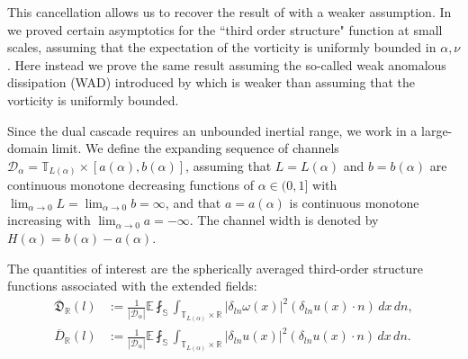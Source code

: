 \documentclass[11pt,a4paper]{article}
\numberwithin{equation}{section}
\numberwithin{theorem}{section}
\numberwithin{remark}{section}
\numberwithin{definition}{section}
\begin{document}
This cancellation allows us to recover the result of \cite{YuriAmiraliGigliola} with a weaker assumption. In \cite{YuriAmiraliGigliola} we proved certain asymptotics for the ``third order structure" function at small scales, assuming that the expectation of the vorticity is uniformly bounded in $\alpha,\nu$. Here instead we prove the same result assuming the so-called weak anomalous dissipation (WAD) introduced by \cite{bed2D} which is weaker than assuming that the vorticity is uniformly bounded. 




Since the dual cascade requires an unbounded inertial range, we work in a large-domain limit. We define the expanding sequence of channels
$\mathcal{D}_\alpha = \mathbb{T}_{L(\alpha)} \times [a(\alpha), b(\alpha)]$,
assuming that $L=L(\alpha)$ and $b=b(\alpha)$ are continuous monotone
decreasing functions of $\alpha \in (0,1]$ with $\lim_{\alpha \to 0}L =
\lim_{\alpha \to 0}b = \infty$, and that $a=a(\alpha)$ is continuous monotone
increasing with $\lim_{\alpha \to 0}a = -\infty$. The channel width is denoted
by $H(\alpha) = b(\alpha) - a(\alpha)$.

The quantities of interest are the spherically averaged third-order structure
functions associated with the extended fields:
\begin{align}
    \overline{\mathfrak{D}}_{\mathbb{R}}(l) &:= \frac{1}{|\mathcal{D}_\alpha|}
    \mathbb{E}\fint_{\mathbb{S}} \int_{\mathbb{T}_{L(\alpha)} \times \mathbb{R}}
    |\delta_{ln}\omega(x)|^2 (\delta_{ln}u(x) \cdot n) \, dx \, dn,
    \label{def:D_vorticity_ext}\\
    \overline{D}_{\mathbb{R}}(l) &:= \frac{1}{|\mathcal{D}_\alpha|}
    \mathbb{E}\fint_{\mathbb{S}} \int_{\mathbb{T}_{L(\alpha)} \times \mathbb{R}}
    |\delta_{ln}u(x)|^2 (\delta_{ln}u(x) \cdot n) \, dx \, dn.
    \label{def:D_velocity_ext}
\end{align}
\end{document}
